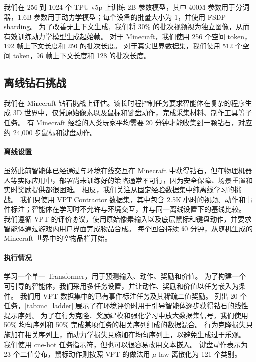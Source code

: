 \documentclass[11pt]{article}
\begin{document}
我们在 256 到 1024 个 TPU-v5p 上训练 2B 参数模型，其中 400M 参数用于分词器，1.6B 参数用于动力学模型；每个设备的批量大小为 1，并使用 FSDP sharding\citep{fsdp,deepspeed}。
为了改善无上下文生成，我们将 30\% 的批次视频视为独立图像，从而有效训练动力学模型生成起始帧。
对于 Minecraft，我们使用 256 个空间 token，192 帧上下文长度和 256 的批次长度。
对于真实世界数据集，我们使用 512 个空间 token，96 帧上下文长度和 128 的批次长度。

\subsection{离线钻石挑战}
\label{sec:control}



我们在 Minecraft 钻石挑战上评估\method。该长时程控制任务要求智能体在复杂的程序生成 3D 世界中，仅凭原始像素以及鼠标和键盘动作，完成采集材料、制作工具等子任务。
有 Minecraft 经验的人类玩家平均需要 20 分钟才能收集到一颗钻石，对应约 24,000 步鼠标和键盘动作。

\paragraph{离线设置}
虽然此前智能体已经通过与环境在线交互在 Minecraft 中获得钻石\citep{vpt,dreamerv3}，但在物理机器人等实际应用中，部署尚未训练好的策略通常不可行，因为安全保障、场景重置和实时奖励提供都很困难。
相反，我们关注从固定经验数据集中纯离线学习的挑战。
我们只使用 VPT Contractor 数据集\citep{vpt}，其中包含 2.5K 小时的视频、动作和事件标注；智能体在学习时不允许与环境交互，并与同一离线设置下的基线比较。
我们遵循 VPT 的评价协议，使用原始像素输入以及底层鼠标和键盘动作，并要求智能体通过游戏内用户界面完成物品合成。
每个回合持续 60 分钟，从随机生成的 Minecraft 世界中的空物品栏开始。

\paragraph{执行情况}
\method 学习一个单一 Transformer，用于预测输入、动作、奖励和价值。
为了构建一个可引导的智能体，我们采用多任务设置，并让动作、奖励和价值以任务嵌入为条件。
我们用 VPT 数据集中的已有事件标注任务及其稀疏二值奖励。
 列出 20 个任务，\cref{tab:mc_ladder} 展示了在环境评价时用于引导智能体逐步获得钻石的线性提示序列。
为了在行为克隆、奖励建模和强化学习中放大数据集信号，我们使用 50\% 均匀序列和 50\% 完成某项任务的相关序列组成的数据混合。
行为克隆损失只施加在相关序列上，而动力学损失只施加在均匀序列上，以避免生成过于乐观。
我们使用 one-hot 任务指示符，但也可以很容易改用文本嵌入。
键盘动作表示为 23 个二值分布，鼠标动作则按照 VPT 的做法用 $\mu$-law 离散化为 121 个类别\citep{vpt}。
\end{document}
